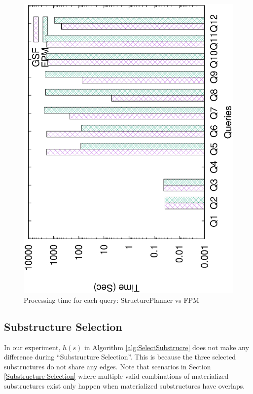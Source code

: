 \begin{figure}[H]
	\centering
	\includegraphics[scale=0.5, angle=270]{plot/qfpm.eps}
	\caption{Processing time for each query: StructurePlanner vs FPM}
	\label{fig:qfpm}
\end{figure}


\subsection{Substructure Selection}
\label{exp:Substructure Selection}

In our experiment, $h(s)$ in Algorithm \ref{alg:SelectSubstrucre} does not make any difference during ``Substructure Selection''. This is because the three selected substructures do not share any edges. Note that scenarios in Section \ref{Substructure Selection} where multiple valid combinations of materialized substructures exist only happen when materialized substructures have overlaps.

